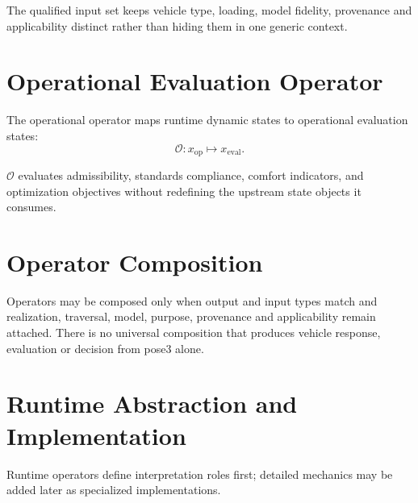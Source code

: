 The qualified input set keeps vehicle type, loading, model fidelity,
provenance and applicability distinct rather than hiding them in one generic
context.

\section{Operational Evaluation Operator}

\begin{definition}
\label{def:runtime-operational-operator}
The operational operator maps runtime dynamic states to operational
evaluation states:
\[
\mathcal O :
x_{\mathrm{op}}
\mapsto
x_{\mathrm{eval}}.
\]
\end{definition}

\(\mathcal O\) evaluates admissibility, standards compliance, comfort
indicators, and optimization objectives without redefining the upstream
state objects it consumes.

\section{Operator Composition}


Operators may be composed only when output and input types match and
realization, traversal, model, purpose, provenance and applicability remain
attached. There is no universal composition that produces vehicle response,
evaluation or decision from pose3 alone.

\section{Runtime Abstraction and Implementation}

\begin{principle}
\label{princ:runtime-abstraction-principle}
Runtime operators define interpretation roles first; detailed mechanics
may be added later as specialized implementations.
\end{principle}

